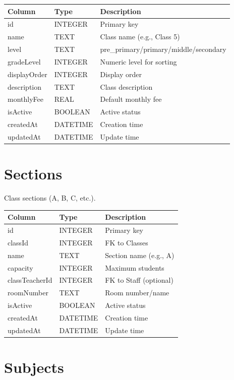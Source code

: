 \documentclass[12pt,a4paper]{report}
\begin{document}
\begin{longtable}{@{}p{4cm}p{2.5cm}p{6.5cm}@{}}
\toprule
\textbf{Column} & \textbf{Type} & \textbf{Description} \\
\midrule
\endhead
id & INTEGER & Primary key \\
name & TEXT & Class name (e.g., Class 5) \\
level & TEXT & pre\_primary/primary/middle/secondary \\
gradeLevel & INTEGER & Numeric level for sorting \\
displayOrder & INTEGER & Display order \\
description & TEXT & Class description \\
monthlyFee & REAL & Default monthly fee \\
isActive & BOOLEAN & Active status \\
createdAt & DATETIME & Creation time \\
updatedAt & DATETIME & Update time \\
\bottomrule
\end{longtable}

\section{Sections}

Class sections (A, B, C, etc.).

\begin{longtable}{@{}p{4cm}p{2.5cm}p{6.5cm}@{}}
\toprule
\textbf{Column} & \textbf{Type} & \textbf{Description} \\
\midrule
\endhead
id & INTEGER & Primary key \\
classId & INTEGER & FK to Classes \\
name & TEXT & Section name (e.g., A) \\
capacity & INTEGER & Maximum students \\
classTeacherId & INTEGER & FK to Staff (optional) \\
roomNumber & TEXT & Room number/name \\
isActive & BOOLEAN & Active status \\
createdAt & DATETIME & Creation time \\
updatedAt & DATETIME & Update time \\
\bottomrule
\end{longtable}

\section{Subjects}
\end{document}
